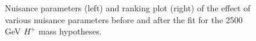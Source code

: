 \begin{figure}[H]
  \centering
  \caption{Nuisance parameters (left) and ranking plot (right) of the effect of various nuisance parameters before and after the fit for the 2500 GeV $H^{+}$ mass hypotheses.}
\end{figure}
